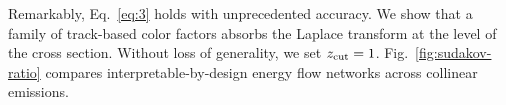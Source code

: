 Remarkably, Eq.~\eqref{eq:3} holds with unprecedented accuracy. We show
that a family of track-based color factors absorbs the Laplace transform
at the level of the cross section. Without loss of generality, we set
$z_{\rm cut} = 1$. Fig.~\ref{fig:sudakov-ratio} compares
interpretable-by-design energy flow networks across collinear emissions.

